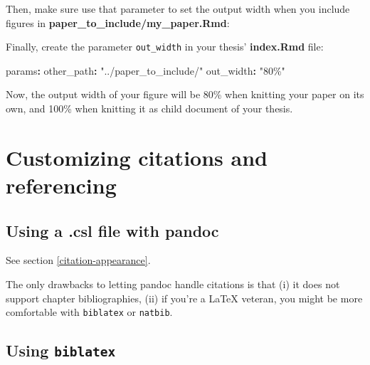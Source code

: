 \documentclass[a4paper, nobind]{templates/ociamthesis}
\newenvironment{Shaded}{\begin{snugshade}}{\end{snugshade}}
\newcommand{\AttributeTok}[1]{\textcolor[rgb]{0.77,0.63,0.00}{#1}}
\newcommand{\FunctionTok}[1]{\textcolor[rgb]{0.00,0.00,0.00}{#1}}
\newcommand{\InformationTok}[1]{\textcolor[rgb]{0.56,0.35,0.01}{\textbf{\textit{#1}}}}
\newcommand{\KeywordTok}[1]{\textcolor[rgb]{0.13,0.29,0.53}{\textbf{#1}}}
\newcommand{\StringTok}[1]{\textcolor[rgb]{0.31,0.60,0.02}{#1}}
\renewenvironment{Shaded}
{
  \vspace{10pt}%
  \begin{snugshade}%
}{%
  \end{snugshade}%
  \vspace{8pt}%
}
\begin{document}
Then, make sure use that parameter to set the output width when you include figures in \textbf{paper\_to\_include/my\_paper.Rmd}:

\begin{Shaded}
\end{Shaded}

Finally, create the parameter \texttt{out\_width} in your thesis' \textbf{index.Rmd} file:

\begin{Shaded}
\begin{Highlighting}[]
\FunctionTok{params}\KeywordTok{:}
\AttributeTok{  }\FunctionTok{other\_path}\KeywordTok{:}\AttributeTok{ }\StringTok{"../paper\_to\_include/"}
\AttributeTok{  }\FunctionTok{out\_width}\KeywordTok{:}\AttributeTok{ }\StringTok{"80\%"}
\end{Highlighting}
\end{Shaded}

Now, the output width of your figure will be 80\% when knitting your paper on its own, and 100\% when knitting it as child document of your thesis.

\hypertarget{customising-citations}{%
\section{Customizing citations and referencing}\label{customising-citations}}

\hypertarget{using-a-.csl-file-with-pandoc}{%
\subsection{Using a .csl file with pandoc}\label{using-a-.csl-file-with-pandoc}}

See section \ref{citation-appearance}.

The only drawbacks to letting pandoc handle citations is that (i) it does not support chapter bibliographies, (ii) if you're a LaTeX veteran, you might be more comfortable with \texttt{biblatex} or \texttt{natbib}.

\hypertarget{biblatex-custom}{%
\subsection{\texorpdfstring{Using \texttt{biblatex}}{Using biblatex}}\label{biblatex-custom}}
\end{document}
